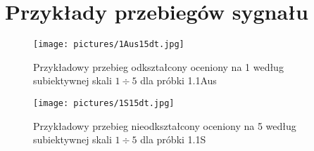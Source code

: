 \chapter{Przykłady przebiegów sygnału} %

\label{app:suplementA}

\begin{figure}[htpb]
\centering
\texttt{[image: pictures/1Aus15dt.jpg]}
\label{fig:distorted_signal} 
\caption{Przykładowy przebieg odkształcony oceniony na 1 według subiektywnej 
skali $1\div5$ dla próbki 1.1Aus} 
\end{figure}

\begin{figure}[htpb]
\centering
\texttt{[image: pictures/1S15dt.jpg]}
\label{fig:ideal_signal} 
\caption{Przykładowy przebieg nieodkształcony oceniony na 5 według subiektywnej 
skali $1\div5$ dla próbki 1.1S} 
\end{figure}